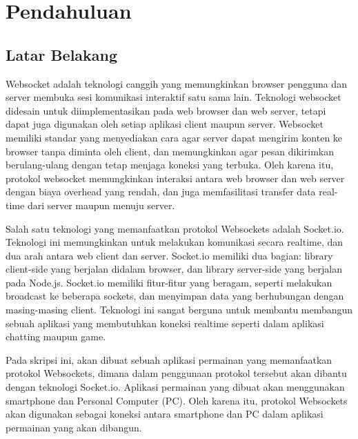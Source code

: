 \chapter{Pendahuluan}
\label{chap:intro}
   
\section{Latar Belakang}
\label{sec:label}

Websocket adalah teknologi canggih yang memungkinkan browser pengguna dan server membuka sesi komunikasi interaktif satu sama lain. Teknologi websocket didesain untuk diimplementasikan pada web browser dan web server, tetapi dapat juga digunakan oleh setiap aplikasi client maupun server. Websocket memiliki standar yang menyediakan cara agar server dapat mengirim konten ke browser tanpa diminta oleh client, dan memungkinkan agar pesan dikirimkan berulang-ulang dengan tetap menjaga koneksi yang terbuka. Oleh karena itu, protokol websocket memungkinkan interaksi antara web browser dan web server dengan biaya overhead yang rendah, dan juga memfasilitasi transfer data real-time dari server maupun menuju server.

Salah satu teknologi yang memanfaatkan protokol Websockets adalah Socket.io. Teknologi ini memungkinkan untuk melakukan komunikasi secara realtime, dan dua arah antara web client dan server. Socket.io memiliki dua bagian: library client-side yang berjalan didalam browser, dan library server-side yang berjalan pada Node.js. Socket.io memiliki fitur-fitur yang beragam, seperti melakukan broadcast ke beberapa sockets, dan menyimpan data yang berhubungan dengan masing-masing client. Teknologi ini sangat berguna untuk membantu membangun sebuah aplikasi yang membutuhkan koneksi realtime seperti dalam aplikasi chatting maupun game.

Pada skripsi ini, akan dibuat sebuah aplikasi permainan yang memanfaatkan protokol Websockets, dimana dalam penggunaan protokol tersebut akan dibantu dengan teknologi Socket.io. Aplikasi permainan yang dibuat akan menggunakan smartphone dan Personal Computer (PC). Oleh karena itu, protokol Websockets akan digunakan sebagai koneksi antara smartphone dan PC dalam aplikasi permainan yang akan dibangun.

